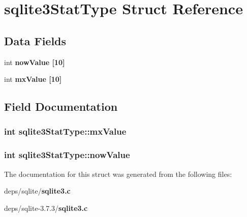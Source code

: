\section{sqlite3Stat\-Type Struct Reference}
\label{structsqlite3StatType}
\subsection*{Data Fields}
\begin{CompactItemize}
\item 
int \bf{now\-Value} [10]
\item 
int \bf{mx\-Value} [10]
\end{CompactItemize}


\subsection{Field Documentation}
\subsubsection{\setlength{\rightskip}{0pt plus 5cm}int \bf{sqlite3Stat\-Type::mx\-Value}}\label{structsqlite3StatType_76791b412b6786e9d3ad78d23488f8e9}


\subsubsection{\setlength{\rightskip}{0pt plus 5cm}int \bf{sqlite3Stat\-Type::now\-Value}}\label{structsqlite3StatType_c0456829091f4c5ed6987b19f26e4592}




The documentation for this struct was generated from the following files:\begin{CompactItemize}
\item 
deps/sqlite/\bf{sqlite3.c}\item 
deps/sqlite-3.7.3/\bf{sqlite3.c}\end{CompactItemize}
